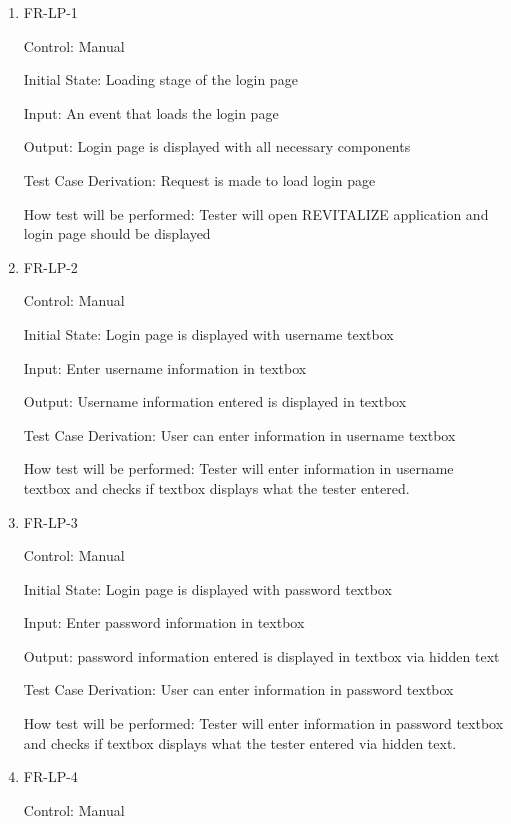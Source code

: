 \documentclass[12pt, titlepage]{article}
\begin{document}
\begin{enumerate}

\item{FR-LP-1\\}

Control: Manual
					
Initial State: Loading stage of the login page
					
Input: An event that loads the login page
					
Output: Login page is displayed with all necessary components

Test Case Derivation: Request is made to load login page
					
How test will be performed: Tester will open REVITALIZE application and login page should be displayed
					
\item{FR-LP-2\\}

Control: Manual
					
Initial State: Login page is displayed with username textbox
					
Input: Enter username information in textbox
					
Output: Username information entered is displayed in textbox

Test Case Derivation: User can enter information in username textbox

How test will be performed: Tester will enter information in username textbox and checks if textbox displays what the tester entered.

\item{FR-LP-3\\}

Control: Manual
					
Initial State: Login page is displayed with password textbox
					
Input: Enter password information in textbox
					
Output: password information entered is displayed in textbox via hidden text

Test Case Derivation: User can enter information in password textbox

How test will be performed: Tester will enter information in password textbox and checks if textbox displays what the tester entered via hidden text.

\item{FR-LP-4\\}

Control: Manual
					

\end{enumerate}
\end{document}
